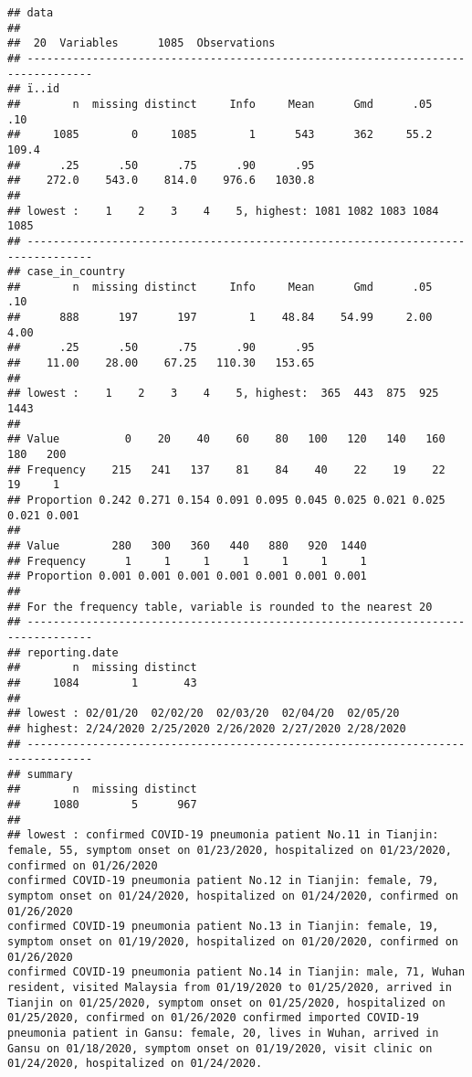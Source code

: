 \documentclass[
]{article}
\begin{document}
\begin{verbatim}
## data 
## 
##  20  Variables      1085  Observations
## --------------------------------------------------------------------------------
## ï..id 
##        n  missing distinct     Info     Mean      Gmd      .05      .10 
##     1085        0     1085        1      543      362     55.2    109.4 
##      .25      .50      .75      .90      .95 
##    272.0    543.0    814.0    976.6   1030.8 
## 
## lowest :    1    2    3    4    5, highest: 1081 1082 1083 1084 1085
## --------------------------------------------------------------------------------
## case_in_country 
##        n  missing distinct     Info     Mean      Gmd      .05      .10 
##      888      197      197        1    48.84    54.99     2.00     4.00 
##      .25      .50      .75      .90      .95 
##    11.00    28.00    67.25   110.30   153.65 
## 
## lowest :    1    2    3    4    5, highest:  365  443  875  925 1443
##                                                                             
## Value          0    20    40    60    80   100   120   140   160   180   200
## Frequency    215   241   137    81    84    40    22    19    22    19     1
## Proportion 0.242 0.271 0.154 0.091 0.095 0.045 0.025 0.021 0.025 0.021 0.001
##                                                     
## Value        280   300   360   440   880   920  1440
## Frequency      1     1     1     1     1     1     1
## Proportion 0.001 0.001 0.001 0.001 0.001 0.001 0.001
## 
## For the frequency table, variable is rounded to the nearest 20
## --------------------------------------------------------------------------------
## reporting.date 
##        n  missing distinct 
##     1084        1       43 
## 
## lowest : 02/01/20  02/02/20  02/03/20  02/04/20  02/05/20 
## highest: 2/24/2020 2/25/2020 2/26/2020 2/27/2020 2/28/2020
## --------------------------------------------------------------------------------
## summary 
##        n  missing distinct 
##     1080        5      967 
## 
## lowest : confirmed COVID-19 pneumonia patient No.11 in Tianjin: female, 55, symptom onset on 01/23/2020, hospitalized on 01/23/2020, confirmed on 01/26/2020                                                                                                 confirmed COVID-19 pneumonia patient No.12 in Tianjin: female, 79, symptom onset on 01/24/2020, hospitalized on 01/24/2020, confirmed on 01/26/2020                                                                                                 confirmed COVID-19 pneumonia patient No.13 in Tianjin: female, 19, symptom onset on 01/19/2020, hospitalized on 01/20/2020, confirmed on 01/26/2020                                                                                                 confirmed COVID-19 pneumonia patient No.14 in Tianjin: male, 71, Wuhan resident, visited Malaysia from 01/19/2020 to 01/25/2020, arrived in Tianjin on 01/25/2020, symptom onset on 01/25/2020, hospitalized on 01/25/2020, confirmed on 01/26/2020 confirmed imported COVID-19 pneumonia patient in Gansu: female, 20, lives in Wuhan, arrived in Gansu on 01/18/2020, symptom onset on 01/19/2020, visit clinic on 01/24/2020, hospitalized on 01/24/2020.                                           

\end{verbatim}
\end{document}
